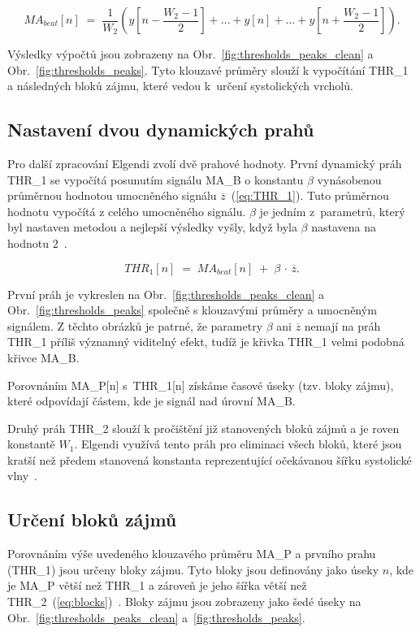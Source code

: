 \begin{equation}
	MA_{beat}[n] \;=\;
	\frac{1}{W_2}
	(y[n - \frac{W_2-1}{2}] + \ldots + y[n] + \ldots + y[n + \frac{W_2-1}{2}]).
	\label{eq:MA_B}
\end{equation}

Výsledky výpočtů jsou zobrazeny na Obr.~\ref{fig:thresholds_peaks_clean} a Obr.~\ref{fig:thresholds_peaks}.
Tyto klouzavé průměry slouží k vypočítání \acs{THR_1} a následných bloků zájmu, které vedou k~určení systolických vrcholů.

\subsection*{Nastavení dvou dynamických prahů}
\label{sec:thresholds}
% 
Pro další zpracování Elgendi zvolí dvě prahové hodnoty.
První dynamický práh \acs{THR_1} se vypočítá posunutím signálu \acs{MA_B} o konstantu \(\beta\) vynásobenou průměrnou hodnotou umocněného signálu \(\overline{z}\)~(\ref{eq:THR_1}).
Tuto průměrnou hodnotu vypočítá z celého umocněného signálu.
\(\beta\) je jedním z~parametrů, který byl nastaven metodou  a nejlepší výsledky vyšly, když byla $\beta$ nastavena na hodnotu $2$~\cite{Elgendi2013}.

\begin{equation}
	THR_1[n] \;=\; MA_{beat}[n] \;+\; \beta \,\cdot\, \overline{z}.
	\label{eq:THR_1}
\end{equation}

První práh je vykreslen na Obr.~\ref{fig:thresholds_peaks_clean} a Obr.~\ref{fig:thresholds_peaks} společně s klouzavými průměry a umocněným signálem.
Z těchto obrázků je patrné, že parametry \(\beta\) ani \(\overline{z}\) nemají na práh \acs{THR_1} příliš významný viditelný efekt, tudíž je křivka \acs{THR_1} velmi podobná křivce \acs{MA_B}.

Porovnáním \acs{MA_P}[n] s~\acs{THR_1}[n] získáme časové úseky (tzv. bloky zájmu), které odpovídají částem, kde je signál nad úrovní \acs{MA_B}.

Druhý práh \acs{THR_2} slouží k pročištění již stanovených bloků zájmů a je roven konstantě \(W_1\).
Elgendi využívá tento práh pro eliminaci všech bloků, které jsou kratší než předem stanovená konstanta reprezentující očekávanou šířku systolické vlny~\cite{Elgendi2013}.

\subsection*{Určení bloků zájmů}
\label{sec:blocks}
Porovnáním výše uvedeného klouzavého průměru \acs{MA_P} a prvního prahu (\acs{THR_1}) jsou určeny bloky zájmu.
Tyto bloky jsou definovány jako úseky $n$, kde je \acs{MA_P} větší než \acs{THR_1} a zároveň je jeho šířka větší než \acs{THR_2}~(\ref{eq:blocks})~\cite{Elgendi2013}.
Bloky zájmu jsou zobrazeny jako šedé úseky na Obr.~\ref{fig:thresholds_peaks_clean} a~\ref{fig:thresholds_peaks}.

